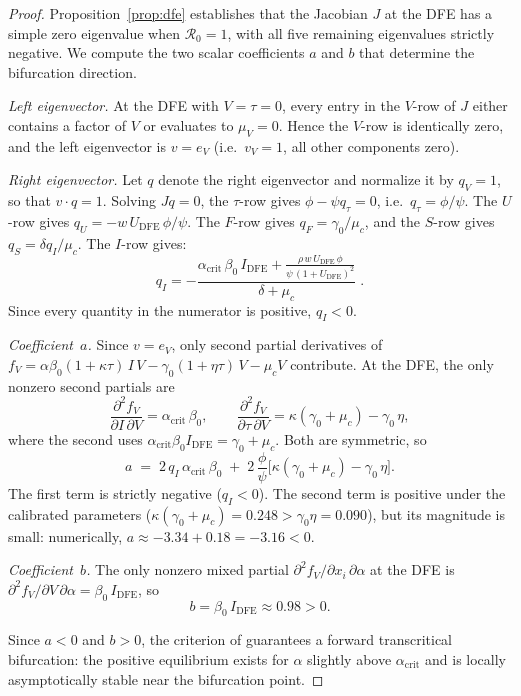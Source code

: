 \documentclass[11pt]{article}
\begin{document}
\begin{proof}
Proposition~\ref{prop:dfe} establishes that the Jacobian $J$ at the DFE has a simple zero eigenvalue when $\mathcal{R}_0 = 1$, with all five remaining eigenvalues strictly negative. We compute the two scalar coefficients $a$ and $b$ that determine the bifurcation direction.

\emph{Left eigenvector.}
At the DFE with $V = \tau = 0$, every entry in the $V$-row of $J$ either contains a factor of $V$ or evaluates to $\mu_V = 0$. Hence the $V$-row is identically zero, and the left eigenvector is $v = e_V$ (i.e.\ $v_V = 1$, all other components zero).

\emph{Right eigenvector.}
Let $q$ denote the right eigenvector and normalize it by $q_V = 1$, so that $v \cdot q = 1$. Solving $Jq = 0$, the $\tau$-row gives $\phi - \psi q_\tau = 0$, i.e.\ $q_\tau = \phi/\psi$. The $U$-row gives $q_U = -w\,U_{\mathrm{DFE}}\,\phi/\psi$. The $F$-row gives $q_F = \gamma_0/\mu_c$, and the $S$-row gives $q_S = \delta q_I / \mu_c$. The $I$-row gives:
\begin{equation}
q_I = -\frac{\alpha_{\mathrm{crit}}\,\beta_0\,I_{\mathrm{DFE}} + \frac{\rho\,w\,U_{\mathrm{DFE}}\,\phi}{\psi\,(1+U_{\mathrm{DFE}})^2}}{\delta + \mu_c}\;.
\label{eq:qI}
\end{equation}
Since every quantity in the numerator is positive, $q_I < 0$.

\emph{Coefficient~$a$.}
Since $v = e_V$, only second partial derivatives of $f_V = \alpha\beta_0(1{+}\kappa\tau)\,I\,V - \gamma_0(1{+}\eta\tau)\,V - \mu_c V$ contribute. At the DFE, the only nonzero second partials are
\[
\frac{\partial^2 f_V}{\partial I\,\partial V} = \alpha_{\mathrm{crit}}\,\beta_0, \qquad
\frac{\partial^2 f_V}{\partial \tau\,\partial V} = \kappa(\gamma_0 {+} \mu_c) - \gamma_0\,\eta,
\]
where the second uses $\alpha_{\mathrm{crit}}\beta_0 I_{\mathrm{DFE}} = \gamma_0 + \mu_c$. Both are symmetric, so
\[
 a \;=\; 2\,q_I\,\alpha_{\mathrm{crit}}\,\beta_0 \;+\; 2\,\frac{\phi}{\psi}\bigl[\kappa(\gamma_0 {+} \mu_c) - \gamma_0\,\eta\bigr].
\]
The first term is strictly negative ($q_I < 0$). The second term is positive under the calibrated parameters ($\kappa(\gamma_0{+}\mu_c) = 0.248 > \gamma_0\eta = 0.090$), but its magnitude is small: numerically, $a \approx -3.34 + 0.18 = -3.16 < 0$.

\emph{Coefficient~$b$.}
The only nonzero mixed partial $\partial^2 f_V/\partial x_i\,\partial\alpha$ at the DFE is $\partial^2 f_V/\partial V\,\partial\alpha = \beta_0\,I_{\mathrm{DFE}}$, so
\[
b = \beta_0\,I_{\mathrm{DFE}} \approx 0.98 > 0.
\]

Since $a < 0$ and $b > 0$, the criterion of \cite{castilloChavez2004} guarantees a forward transcritical bifurcation: the positive equilibrium exists for $\alpha$ slightly above $\alpha_{\mathrm{crit}}$ and is locally asymptotically stable near the bifurcation point.
\end{proof}
\end{document}
